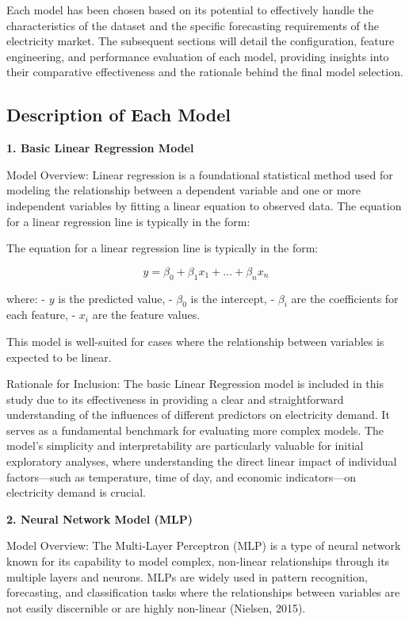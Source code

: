 \documentclass[
]{article}
\begin{document}
Each model has been chosen based on its potential to effectively handle
the characteristics of the dataset and the specific forecasting
requirements of the electricity market. The subsequent sections will
detail the configuration, feature engineering, and performance
evaluation of each model, providing insights into their comparative
effectiveness and the rationale behind the final model selection.

\subsection{Description of Each Model}\label{description-of-each-model}

\textbf{1. Basic Linear Regression Model}

Model Overview: Linear regression is a foundational statistical method
used for modeling the relationship between a dependent variable and one
or more independent variables by fitting a linear equation to observed
data. The equation for a linear regression line is typically in the
form:

The equation for a linear regression line is typically in the form:

\[ y = \beta_0 + \beta_1 x_1 + \dots + \beta_n x_n \]

where: - \(y\) is the predicted value, - \(\beta_0\) is the intercept, -
\(\beta_i\) are the coefficients for each feature, - \(x_i\) are the
feature values.

This model is well-suited for cases where the relationship between
variables is expected to be linear.

Rationale for Inclusion: The basic Linear Regression model is included
in this study due to its effectiveness in providing a clear and
straightforward understanding of the influences of different predictors
on electricity demand. It serves as a fundamental benchmark for
evaluating more complex models. The model's simplicity and
interpretability are particularly valuable for initial exploratory
analyses, where understanding the direct linear impact of individual
factors---such as temperature, time of day, and economic indicators---on
electricity demand is crucial.

\textbf{2. Neural Network Model (MLP)}

Model Overview: The Multi-Layer Perceptron (MLP) is a type of neural
network known for its capability to model complex, non-linear
relationships through its multiple layers and neurons. MLPs are widely
used in pattern recognition, forecasting, and classification tasks where
the relationships between variables are not easily discernible or are
highly non-linear (Nielsen, 2015).
\end{document}
